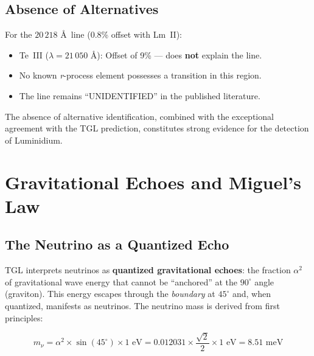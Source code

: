 \documentclass[12pt,a4paper,twoside]{article}
\newcommand{\alphaii}{\alpha^{2}}
\newcommand{\boundary}{\textit{boundary}}
\begin{document}
\subsection{Absence of Alternatives}

For the $20\,218$ \AA\ line (0.8\% offset with Lm~II):
\begin{itemize}[nosep]
\item Te~III ($\lambda = 21\,050$ \AA): Offset of 9\% --- does \textbf{not} explain the line.
\item No known \textit{r}-process element possesses a transition in this region.
\item The line remains ``UNIDENTIFIED'' in the published literature.
\end{itemize}

The absence of alternative identification, combined with the exceptional agreement with the TGL prediction, constitutes strong evidence for the detection of Luminidium.


\section{Gravitational Echoes and Miguel's Law}


\subsection{The Neutrino as a Quantized Echo}

TGL interprets neutrinos as \textbf{quantized gravitational echoes}: the fraction $\alphaii$ of gravitational wave energy that cannot be ``anchored'' at the $90^\circ{}$ angle (graviton). This energy escapes through the \boundary{} at $45^\circ$ and, when quantized, manifests as neutrinos. The neutrino mass is derived from first principles:

\begin{equationbox}[title={TGL Neutrino Mass}]
\begin{equation}
\boxed{m_\nu = \alphaii \times \sin(45^\circ) \times 1\text{ eV} = 0.012031 \times \frac{\sqrt{2}}{2} \times 1\text{ eV} = 8.51\text{ meV}}
\label{eq:neutrino_mass}
\end{equation}
\end{equationbox}
\end{document}
